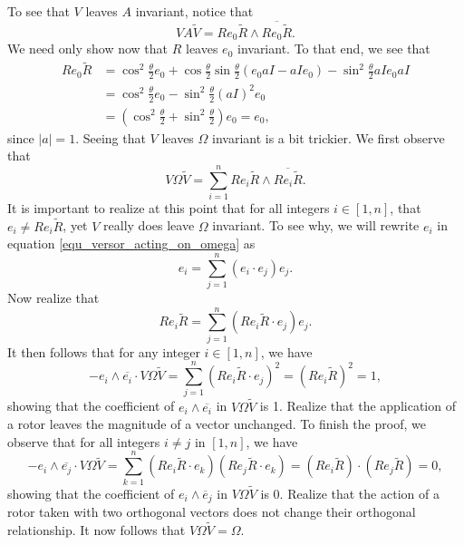 \documentclass{birkjour}
\theoremstyle{definition}
\theoremstyle{remark}
\numberwithin{equation}{section}
\begin{document}
To see that $V$ leaves $A$ invariant, notice that
\begin{equation}
VA\tilde{V} = Re_0\tilde{R}\wedge\overline{Re_0\tilde{R}}.
\end{equation}
We need only show now that $R$ leaves $e_0$ invariant.  To that end, we see that
\begin{align}
Re_0\tilde{R} &= \cos^2\frac{\theta}{2}e_0 + \cos\frac{\theta}{2}\sin\frac{\theta}{2}(e_0 aI - aIe_0) - \sin^2\frac{\theta}{2}aIe_0aI \\
 &= \cos^2\frac{\theta}{2}e_0 - \sin^2\frac{\theta}{2}(aI)^2 e_0 \\
 &= \left(\cos^2\frac{\theta}{2}+\sin^2\frac{\theta}{2}\right)e_0 = e_0,
\end{align}
since $|a|=1$.  Seeing that $V$ leaves $\Omega$ invariant is a bit trickier.  We first
observe that
\begin{equation}\label{equ_versor_acting_on_omega}
V\Omega\tilde{V} = \sum_{i=1}^n Re_i\tilde{R}\wedge\overline{R e_i\tilde{R}}.
\end{equation}
It is important to realize at this point that for all integers $i\in[1,n]$, that $e_i\neq Re_i\tilde{R}$,
yet $V$ really does leave $\Omega$ invariant.  To see why, we will rewrite $e_i$
in equation \eqref{equ_versor_acting_on_omega} as
\begin{equation}
e_i = \sum_{j=1}^n (e_i\cdot e_j)e_j.
\end{equation}
Now realize that
\begin{equation}
Re_i\tilde{R} = \sum_{j=1}^n (Re_i\tilde{R}\cdot e_j)e_j.
\end{equation}
It then follows that for any integer $i\in[1,n]$, we have
\begin{equation}
-e_i\wedge\overline{e_i}\cdot V\Omega\tilde{V} = \sum_{j=1}^n (Re_i\tilde{R}\cdot e_j)^2 = (Re_i\tilde{R})^2 = 1,
\end{equation}
showing that the coefficient of $e_i\wedge\overline{e_i}$ in $V\Omega\tilde{V}$ is 1.  Realize that
the application of a rotor leaves the magnitude of a vector unchanged.  To finish the proof, we
observe that for all integers $i\neq j$ in $[1,n]$, we have
\begin{equation}
-e_i\wedge\overline{e_j}\cdot V\Omega\tilde{V} =
\sum_{k=1}^n (Re_i\tilde{R}\cdot e_k)(Re_j\tilde{R}\cdot e_k)
= (Re_i\tilde{R})\cdot(Re_j\tilde{R}) = 0,
\end{equation}
showing that the coefficient of $e_i\wedge\overline e_j$ in $V\Omega\tilde{V}$ is 0.  Realize that
the action of a rotor taken with two orthogonal vectors does not change their orthogonal relationship.
It now follows that $V\Omega\tilde{V}=\Omega$.
\end{document}
